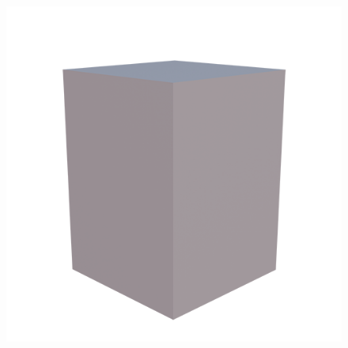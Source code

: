 \documentclass[10pt,twocolumn,letterpaper]{article}
\begin{document}
\begin{figure}[htbp]
\begin{minipage}[b]{0.19\textwidth}
  \end{minipage}
  \hfill
  \begin{minipage}[b]{0.19\textwidth}
      \centering
      \includegraphics[width=\textwidth]{images/Bld1.png} %


\end{minipage}
\end{figure}
\end{document}
